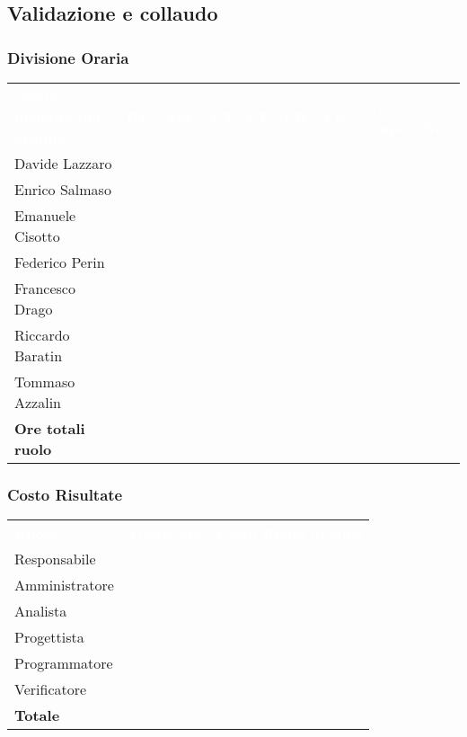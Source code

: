 \subsection{Validazione e collaudo}

\subsubsection{Divisione Oraria}
{
	\renewcommand{\arraystretch}{2}
	\centering
	\begin{longtable}{ C{5cm} C{1cm} C{1cm} C{1cm} C{1cm} C{1cm} C{1cm} C{3cm}}
		\textcolor{white}{\textbf{Nome membro del gruppo}} & \textcolor{white}{\textbf{RE}} & \textcolor{white}{\textbf{AM}} & \textcolor{white}{\textbf{AN}} & \textcolor{white}{\textbf{PT}} & \textcolor{white}{\textbf{PR}} & \textcolor{white}{\textbf{VE}} & \textcolor{white}{\textbf{Ore complessive}}\\	
        
        Davide Lazzaro & & & & & & & \\
        Enrico Salmaso & & & & & & & \\
        Emanuele Cisotto & & & & & & & \\
        Federico Perin & & & & & & & \\
        Francesco Drago & & & & & & & \\
        Riccardo Baratin & & & & & & & \\
        Tommaso Azzalin & & & & & & & \\
        \textbf{Ore totali ruolo} & & & & & & & \\
		
	\end{longtable}
}

\subsubsection{Costo Risultate}
{
	\renewcommand{\arraystretch}{2}
	\centering
	\begin{longtable}{ C{3cm} C{2cm} C{4cm}}
		\textcolor{white}{\textbf{Ruolo}} & \textcolor{white}{\textbf{Totale ore}} & \textcolor{white}{\textbf{Costo Ruolo in euro}}\\	
        
        Responsabile & & \\
        Amministratore & & \\
        Analista & & \\
        Progettista & & \\
        Programmatore & & \\
        Verificatore & & \\
        \textbf{Totale} & & \\
		
	\end{longtable}
}

